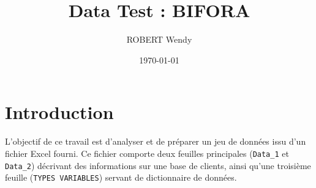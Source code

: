 \documentclass[11pt]{article}
\title{
  Data Test : BIFORA
}
\author{
  ROBERT Wendy
}
\date{\today}
\begin{document}
\maketitle
\tableofcontents
\newpage

\section*{Introduction}
L'objectif de ce travail est d'analyser et de préparer un jeu de données issu d'un fichier Excel fourni. 
Ce fichier comporte deux feuilles principales (\texttt{Data\_1} et \texttt{Data\_2}) décrivant des informations 
sur une base de clients, ainsi qu'une troisième feuille (\texttt{TYPES VARIABLES}) servant de dictionnaire de données. 




\end{document}
